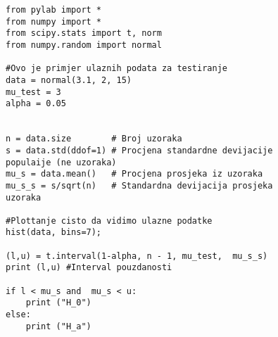 \begin{figure}[H]
\begin{verbatim}
from pylab import *
from numpy import *
from scipy.stats import t, norm
from numpy.random import normal

#Ovo je primjer ulaznih podata za testiranje
data = normal(3.1, 2, 15)
mu_test = 3
alpha = 0.05


n = data.size        # Broj uzoraka
s = data.std(ddof=1) # Procjena standardne devijacije populaije (ne uzoraka)
mu_s = data.mean()   # Procjena prosjeka iz uzoraka
mu_s_s = s/sqrt(n)   # Standardna devijacija prosjeka uzoraka

#Plottanje cisto da vidimo ulazne podatke
hist(data, bins=7);

(l,u) = t.interval(1-alpha, n - 1, mu_test,  mu_s_s)
print (l,u) #Interval pouzdanosti

if l < mu_s and  mu_s < u:
    print ("H_0")
else:
    print ("H_a")
\end{verbatim}
\end{figure}
